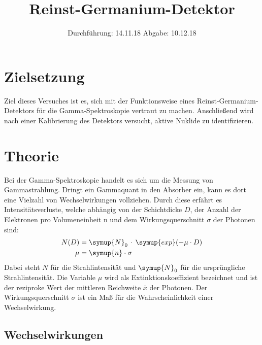 


\subject{V18}
\title{Reinst-Germanium-Detektor}
\date{%
  Durchführung: 14.11.18
  \hspace{3em}
  Abgabe: 10.12.18
}




\maketitle
\thispagestyle{empty}
\tableofcontents
\newpage

\setcounter{page}{1}
\section*{Zielsetzung}

Ziel dieses Versuches ist es, sich mit der Funktionsweise eines Reinst-Germanium-Detektors
für die Gamma-Spektroskopie vertraut zu machen. Anschließend wird nach einer Kalibrierung
des Detektors versucht, aktive Nuklide zu identifizieren.

  \section{Theorie}
    \label{sec:Theorie}

    Bei der Gamma-Spektroskopie handelt es sich um die Messung von Gammastrahlung.
    Dringt ein Gammaquant in den Absorber ein, kann es dort eine Vielzahl von Wechselwirkungen vollziehen.
    Durch diese erfährt es Intensitätsverluste, welche abhängig von der
    Schichtdicke $D$, der Anzahl der Elektronen pro Volumeneinheit n und dem Wirkungsquerschnitt $\sigma$ der Photonen sind:
    \begin{align}
      N(D) &= \symup{N}_0\,\cdot\,\symup{exp}(-\mu\cdot D)\\
      \mu &= \symup{n}\cdot\sigma
    \end{align}
    Dabei steht $N$ für die Strahlintensität und $\symup{N}_0$ für die ursprüngliche
    Strahlintensität.
    Die Variable $\mu$ wird als Extinktionskoeffizient bezeichnet und ist der reziproke Wert der
    mittleren Reichweite $\bar{x}$ der Photonen. Der Wirkungsquerschnitt $\sigma$ ist ein Maß
    für die Wahrscheinlichkeit einer Wechselwirkung.

    \subsection{Wechselwirkungen}
    \label{sec:Wechselwirkungen}


